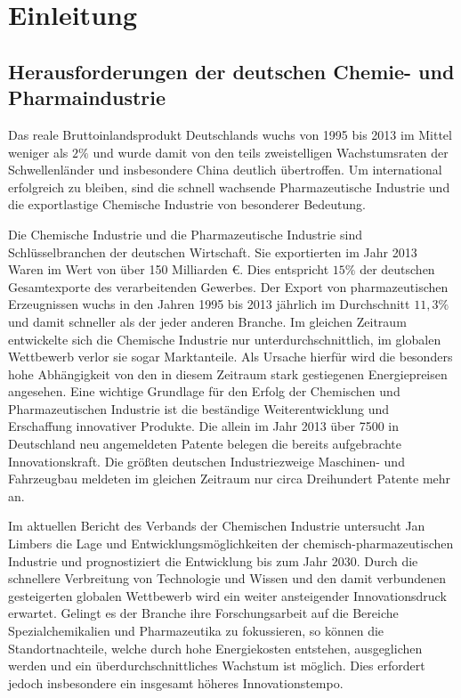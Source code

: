 \chapter{Einleitung}\label{ch:einleitung}
\section{Herausforderungen der deutschen Chemie- und Pharmaindustrie}
Das reale Bruttoinlandsprodukt Deutschlands wuchs von 1995 bis 2013 im Mittel weniger als $2\%$ und wurde damit von den teils zweistelligen Wachstumsraten der Schwellenl\"ander und insbesondere China deutlich \"ubertroffen. Um international erfolgreich zu bleiben, sind die schnell wachsende Pharmazeutische Industrie und die exportlastige Chemische Industrie von besonderer Bedeutung. \hfill \newline

Die Chemische Industrie und die Pharmazeutische Industrie sind Schl\"usselbranchen der deutschen Wirtschaft. Sie exportierten im Jahr 2013 Waren im Wert von \"uber 150 Milliarden \euro. Dies entspricht $15 \%$ der deutschen Gesamtexporte des verarbeitenden Gewerbes. Der Export von pharmazeutischen Erzeugnissen wuchs in den Jahren 1995 bis 2013 j\"ahrlich im Durchschnitt $11,3 \%$ und damit schneller als der jeder anderen Branche. Im gleichen Zeitraum entwickelte sich die Chemische Industrie nur unterdurchschnittlich, im globalen Wettbewerb verlor sie sogar Marktanteile. Als Ursache hierf\"ur wird die besonders hohe Abh\"angigkeit von den in diesem Zeitraum stark gestiegenen Energiepreisen angesehen. \hfill \newline
Eine wichtige Grundlage f\"ur den Erfolg der Chemischen und Pharmazeutischen Industrie ist die best\"andige Weiterentwicklung und Erschaffung innovativer Produkte. Die allein im Jahr 2013 \"uber 7500 in Deutschland neu angemeldeten Patente belegen die bereits aufgebrachte Innovationskraft. Die gr\"o\ss{}ten deutschen Industriezweige Maschinen- und Fahrzeugbau meldeten im gleichen Zeitraum nur circa Dreihundert Patente mehr an. \cite{PerspektiveD_2016} \hfill \newline

Im aktuellen Bericht des Verbands der Chemischen Industrie  untersucht Jan Limbers die Lage und Entwicklungsm\"oglichkeiten der chemisch-pharmazeutischen Industrie und prognostiziert die Entwicklung bis zum Jahr 2030. Durch die schnellere Verbreitung von Technologie und Wissen und den damit verbundenen gesteigerten globalen Wettbewerb wird ein weiter ansteigender Innovationsdruck erwartet. Gelingt es der Branche ihre Forschungsarbeit auf die Bereiche Spezialchemikalien und Pharmazeutika zu fokussieren, so k\"onnen die Standortnachteile, welche durch hohe Energiekosten entstehen, ausgeglichen werden und ein \"uberdurchschnittliches Wachstum ist m\"oglich. Dies erfordert jedoch insbesondere ein insgesamt h\"oheres Innovationstempo. \cite{PerspektiveC_2016} \hfill \newline

